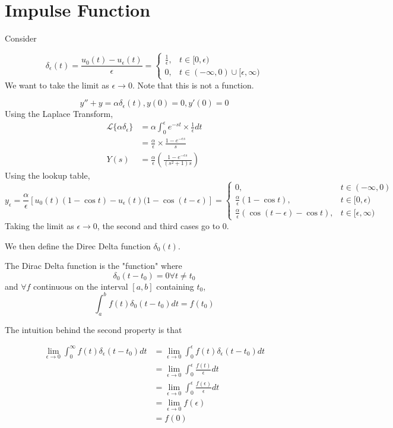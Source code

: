 \documentclass[12pt]{article}
\begin{document}
\section{Impulse Function}

Consider

$$\delta_\epsilon(t) = \frac{u_0(t) - u_\epsilon(t)}{\epsilon} = \begin{cases} \frac{1}{\epsilon}, & t \in [0,\epsilon) \\ 0, & t \in (-\infty, 0) \cup [\epsilon, \infty) \end{cases}$$
We want to take the limit as $\epsilon \rightarrow 0$. Note that this is not a function.

\begin{ex}
	$$y'' + y = \alpha\delta_\epsilon(t), y(0) = 0, y'(0) = 0$$
	Using the Laplace Transform,
	\begin{align*}
		\mathcal{L}\{\alpha\delta_\epsilon\} &= \alpha \int_0^\epsilon e^{-st} \times \frac{1}{\epsilon}dt \\
						     &= \frac{\alpha}{\epsilon} \times \frac{1-e^{-\epsilon s}}{s} \\
		Y(s) &= \frac{\alpha}{\epsilon}\left(\frac{1-e^{-\epsilon s}}{(s^2+1)s}\right)
	\end{align*}
	Using the lookup table,
	$$y_\epsilon = \frac{\alpha}{\epsilon}[u_0(t)(1-\cos t) - u_\epsilon(t)(1-\cos(t-\epsilon)] = \begin{cases} 0, & t \in (-\infty, 0) \\ \frac{\alpha}{\epsilon}(1-\cos t), & t \in [0,\epsilon) \\ \frac{\alpha}{\epsilon}(\cos(t-\epsilon) - \cos t), & t \in [\epsilon, \infty) \end{cases}$$
	Taking the limit as $\epsilon \rightarrow 0$, the second and third cases go to 0.
\end{ex}

We then define the Direc Delta function $\delta_0(t)$.

\begin{defn}
	The Dirac Delta function is the "function" where
	$$\delta_0(t-t_0) = 0 \forall t \neq t_0$$
	and $\forall f$ continuous on the interval $[a,b]$ containing $t_0$,
	$$\int_a^b f(t)\delta_0(t-t_0)dt = f(t_0)$$
\end{defn}

The intuition behind the second property is that

\begin{align*}
	\lim_{\epsilon \rightarrow 0} \int_0^\infty f(t)\delta_\epsilon(t-t_0)dt &= \lim_{\epsilon \rightarrow 0} \int_0^\epsilon f(t)\delta_\epsilon(t-t_0)dt \\
										 &= \lim_{\epsilon \rightarrow 0} \int_0^\epsilon \frac{f(t)}{\epsilon} dt \\
										 &= \lim_{\epsilon \rightarrow 0} \int_0^\epsilon \frac{f(\epsilon)}{\epsilon} dt \\
										 &= \lim_{\epsilon \rightarrow 0} f(\epsilon) \\
										 &= f(0)
\end{align*}
\end{document}
